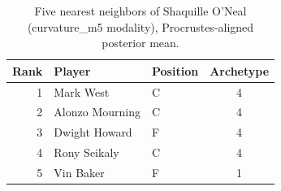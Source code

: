 \begin{table}[htbp]
  \centering\small
  \begin{tabular}{rllc}
    \toprule
    Rank & Player & Position & Archetype \\
    \midrule
    1 & Mark West & C & 4 \\
    2 & Alonzo Mourning & C & 4 \\
    3 & Dwight Howard & F & 4 \\
    4 & Rony Seikaly & C & 4 \\
    5 & Vin Baker & F & 1 \\
    \bottomrule
  \end{tabular}
  \caption{Five nearest neighbors of Shaquille O'Neal (curvature_m5 modality), Procrustes-aligned posterior mean.}
  \label{tab:Shaquille_O_Neal_neighbors_curvature_m5}
\end{table}

